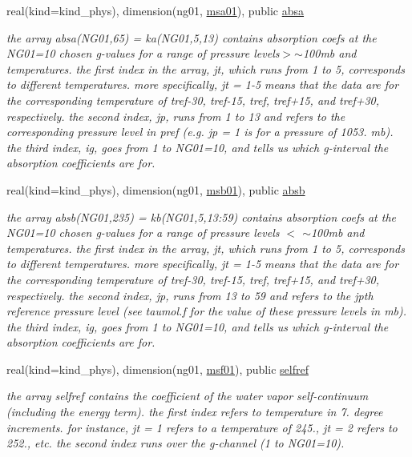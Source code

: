 \begin{DoxyCompactItemize}
real(kind=kind\+\_\+phys), dimension(ng01, \hyperlink{namespacemodule__radlw__kgb01_a60db2a67b7f03a52fa88acd2c7874dfc}{msa01}), public \hyperlink{group__module__radlw__kgbnn_gacdbe767d50d503c4a89d4042dd0dee8e}{absa}
\begin{DoxyCompactList}\small\item\em the array absa(\+N\+G01,65) = ka(\+N\+G01,5,13) contains absorption coefs at the N\+G01=10 chosen g-\/values for a range of pressure levels$>$$\sim$100mb and temperatures. the first index in the array, jt, which runs from 1 to 5, corresponds to different temperatures. more specifically, jt = 1-\/5 means that the data are for the corresponding temperature of tref-\/30, tref-\/15, tref, tref+15, and tref+30, respectively. the second index, jp, runs from 1 to 13 and refers to the corresponding pressure level in pref (e.\+g. jp = 1 is for a pressure of 1053. mb). the third index, ig, goes from 1 to N\+G01=10, and tells us which g-\/interval the absorption coefficients are for. \end{DoxyCompactList}\item 
real(kind=kind\+\_\+phys), dimension(ng01, \hyperlink{group__module__radlw__kgbnn_gae34d953adc793ad27a294864e3e0e354}{msb01}), public \hyperlink{group__module__radlw__kgbnn_gabdaefe1c38d8bfcac5ef9b878fac77cb}{absb}
\begin{DoxyCompactList}\small\item\em the array absb(\+N\+G01,235) = kb(\+N\+G01,5,13\+:59) contains absorption coefs at the N\+G01=10 chosen g-\/values for a range of pressure levels $<$ $\sim$100mb and temperatures. the first index in the array, jt, which runs from 1 to 5, corresponds to different temperatures. more specifically, jt = 1-\/5 means that the data are for the corresponding temperature of tref-\/30, tref-\/15, tref, tref+15, and tref+30, respectively. the second index, jp, runs from 13 to 59 and refers to the jpth reference pressure level (see taumol.\+f for the value of these pressure levels in mb). the third index, ig, goes from 1 to N\+G01=10, and tells us which g-\/interval the absorption coefficients are for. \end{DoxyCompactList}\item 
real(kind=kind\+\_\+phys), dimension(ng01, \hyperlink{group__module__radlw__kgbnn_ga321c2e84e14d28142d08bb5fbe485a67}{msf01}), public \hyperlink{group__module__radlw__kgbnn_ga14c7cc68b26c0ab1fdfda6faa2d485d5}{selfref}
\begin{DoxyCompactList}\small\item\em the array selfref contains the coefficient of the water vapor self-\/continuum (including the energy term). the first index refers to temperature in 7. degree increments. for instance, jt = 1 refers to a temperature of 245., jt = 2 refers to 252., etc. the second index runs over the g-\/channel (1 to N\+G01=10). \end{DoxyCompactList}\item 

\end{DoxyCompactItemize}
